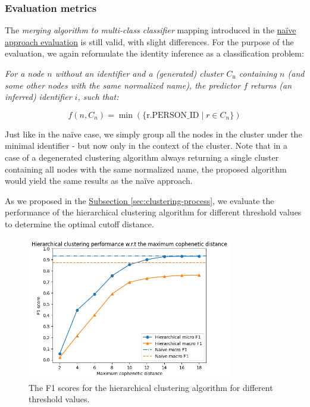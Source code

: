 \subsubsection{Evaluation metrics}

The \textit{merging algorithm to multi-class classifier} mapping introduced in the \hyperref[sec:results-assessment]{naïve approach evaluation} is still valid, with slight differences.
For the purpose of the evaluation, we again reformulate the identity inference as a classification problem:

\textit{For a node $n$ without an identifier and a (generated) cluster $C_{\text{n}}$ containing $n$ (and some other nodes with the same normalized name),
the predictor $f$ returns (an inferred) identifier $i$, such that:}

$$
f(n, C_{n}) = \min(\{\text{r.PERSON\_ID} \mid r \in C_{n}\})
$$

Just like in the naïve case, we simply group all the nodes in the cluster under the minimal identifier - but now only in the context of the cluster.
Note that in a case of a degenerated clustering algorithm always returning a single cluster containing all nodes with the same normalized name, the proposed algorithm would yield the same results as the naïve approach.

As we proposed in the \hyperref[sec:clustering-process]{Subsection \ref*{sec:clustering-process}}, we evaluate the performance of the hierarchical clustering algorithm for different threshold values
to determine the optimal cutoff distance.

\begin{figure}[ht!]
    \captionsetup{width=.9\linewidth}
    \includegraphics[width=0.8\textwidth]{../img/hierarchical-f1.png}
    \centering
    \caption{The F1 scores for the hierarchical clustering algorithm for different threshold values.\protect\footnotemark}
\end{figure}


